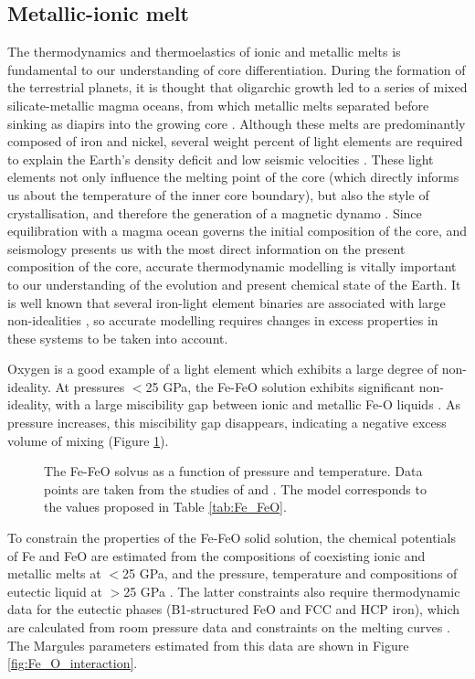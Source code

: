 \subsection{Metallic-ionic melt}
The thermodynamics and thermoelastics of ionic and metallic melts is fundamental to our understanding of core differentiation. During the formation of the terrestrial planets, it is thought that oligarchic growth led to a series of mixed silicate-metallic magma oceans, from which metallic melts separated before sinking as diapirs into the growing core \citep{Rubieetal2015}. Although these melts are predominantly composed of iron and nickel, several weight percent of light elements are required to explain the Earth's density deficit and low seismic velocities \citep{Poirier1994}. These light elements not only influence the melting point of the core (which directly informs us about the temperature of the inner core boundary), but also the style of crystallisation, and therefore the generation of a magnetic dynamo \citep{SSWL2007}. Since equilibration with a magma ocean governs the initial composition of the core, and seismology presents us with the most direct information on the present composition of the core, accurate thermodynamic modelling is vitally important to our understanding of the evolution and present chemical state of the Earth. It is well known that several iron-light element binaries are associated with large non-idealities \citep[e.g.][]{Frostetal2010}, so accurate modelling requires changes in excess properties in these systems to be taken into account.

Oxygen is a good example of a light element which exhibits a large degree of non-ideality. At pressures $<$25 GPa, the Fe-FeO solution exhibits significant non-ideality, with a large miscibility gap between ionic and metallic Fe-O liquids \citep{KS1995,TOT2007,Frostetal2010}. As pressure increases, this miscibility gap disappears, indicating a negative excess volume of mixing (Figure \ref{fig:Fe_O_solvus}).

\begin{figure}[ht!]
  \centering
  \caption{The Fe-FeO solvus as a function of pressure and temperature. Data points are taken from the studies of \cite{TOT2007} and \cite{Frostetal2010}. The model corresponds to the values proposed in Table \ref{tab:Fe_FeO}.}
  \label{fig:Fe_O_solvus}
\end{figure}

To constrain the properties of the Fe-FeO solid solution, the chemical potentials of Fe and FeO are estimated from the compositions of coexisting ionic and metallic melts at $<$25 GPa, and the pressure, temperature and compositions of eutectic liquid at $>$25 GPa \citep{SHCPW2008}. The latter constraints also require thermodynamic data for the eutectic phases (B1-structured FeO and FCC and HCP iron), which are calculated from room pressure data and constraints on the melting curves \citep{SHCPW2008, OTHOH2011, ADMLM2013, Kom2014}.  The Margules parameters estimated from this data are shown in Figure \ref{fig:Fe_O_interaction}. 

